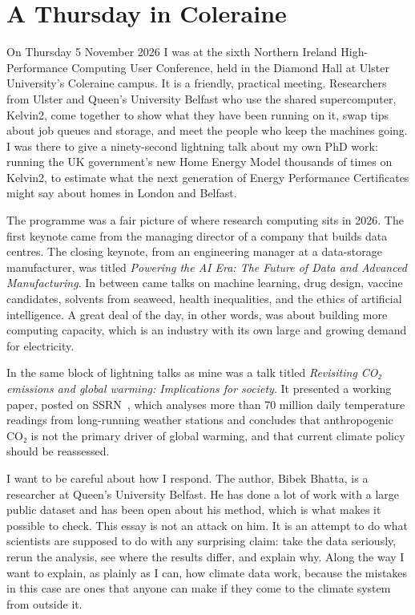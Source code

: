 \chapter{A Thursday in Coleraine}

On Thursday 5 November 2026 I was at the sixth Northern Ireland High-Performance Computing User Conference, held in the Diamond Hall at Ulster University's Coleraine campus. It is a friendly, practical meeting. Researchers from Ulster and Queen's University Belfast who use the shared supercomputer, Kelvin2, come together to show what they have been running on it, swap tips about job queues and storage, and meet the people who keep the machines going. I was there to give a ninety-second lightning talk about my own PhD work: running the UK government's new Home Energy Model thousands of times on Kelvin2, to estimate what the next generation of Energy Performance Certificates might say about homes in London and Belfast.

The programme was a fair picture of where research computing sits in 2026. The first keynote came from the managing director of a company that builds data centres. The closing keynote, from an engineering manager at a data-storage manufacturer, was titled \emph{Powering the AI Era: The Future of Data and Advanced Manufacturing}. In between came talks on machine learning, drug design, vaccine candidates, solvents from seaweed, health inequalities, and the ethics of artificial intelligence. A great deal of the day, in other words, was about building more computing capacity, which is an industry with its own large and growing demand for electricity.

In the same block of lightning talks as mine was a talk titled \emph{Revisiting CO₂ emissions and global warming: Implications for society}. It presented a working paper, posted on SSRN~\citep{bhatta2026}, which analyses more than 70 million daily temperature readings from long-running weather stations and concludes that anthropogenic CO₂ is not the primary driver of global warming, and that current climate policy should be reassessed.

I want to be careful about how I respond. The author, Bibek Bhatta, is a researcher at Queen's University Belfast. He has done a lot of work with a large public dataset and has been open about his method, which is what makes it possible to check. This essay is not an attack on him. It is an attempt to do what scientists are supposed to do with any surprising claim: take the data seriously, rerun the analysis, see where the results differ, and explain why. Along the way I want to explain, as plainly as I can, how climate data work, because the mistakes in this case are ones that anyone can make if they come to the climate system from outside it.
